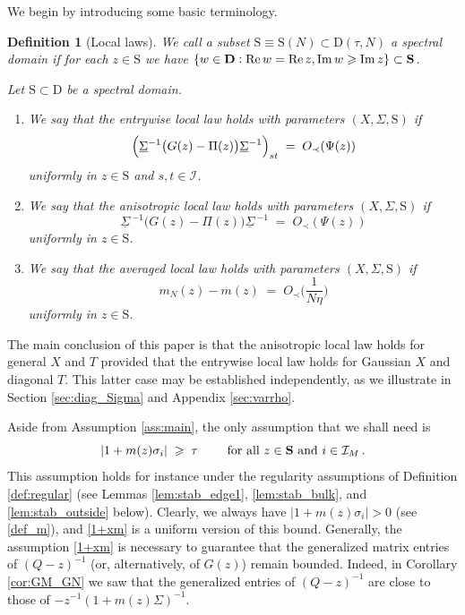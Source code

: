 \documentclass[11pt]{article} %
\numberwithin{equation}{section}
\numberwithin{figure}{section}
\theoremstyle{plain} %
\newtheorem{definition}[theorem]{Definition}
\theoremstyle{definition} %
\newcommand{\f}[1]{\boldsymbol{\mathrm{#1}}} %
\renewcommand{\cal}{\mathcal}
\newcommand{\ul}[1]{\underline{#1} \!\,} %
\newcommand{\txt}[1]{\text{\rm{#1}}}
\newcommand{\col}{\mathrel{\vcenter{\baselineskip0.75ex \lineskiplimit0pt \hbox{.}\hbox{.}}}}
\renewcommand{\geq}{\geqslant}
\newcommand{\pb}[1]{\bigl({#1}\bigr)}
\newcommand{\pB}[1]{\Bigl({#1}\Bigr)}
\newcommand{\pbb}[1]{\biggl({#1}\biggr)}
\newcommand{\h}[1]{\{{#1}\}}
\newcommand{\abs}[1]{\lvert #1 \rvert}
\DeclareMathOperator{\re}{Re}
\DeclareMathOperator{\im}{Im}
\begin{document}
We begin by introducing some basic terminology.
\begin{definition}[Local laws] \label{def:local_laws}
We call a subset $\f S \equiv \f S(N) \subset \f D(\tau, N)$ a \emph{spectral domain} if for each $z \in \f S$ we have $\h{w \in \f D \col \re w = \re z, \im w \geq \im z} \subset \f S$.

Let $\f S \subset \f D$ be a spectral domain.
\begin{enumerate}
\item
We say that the \emph{entrywise local law holds with parameters $(X, \Sigma, \f S)$} if
\begin{equation} \label{entrywise law}
\pB{\ul \Sigma^{-1} \pb{G(z) - \Pi(z)} \ul \Sigma^{-1}}_{st} \;=\; O_\prec(\Psi(z))
\end{equation}
uniformly in $z \in \f S$ and $s,t \in \cal I$.
\item
We say that the \emph{anisotropic local law holds with parameters $(X, \Sigma, \f S)$} if
\begin{equation} \label{isotropic law}
\ul \Sigma^{-1} \pb{G(z) - \Pi(z)} \ul \Sigma^{-1} \;=\; O_\prec(\Psi(z))
\end{equation}
uniformly in $z \in \f S$.
\item
We say that the \emph{averaged local law holds with parameters $(X, \Sigma, \f S)$} if
\begin{equation*}
m_N(z) - m(z) \;=\; O_\prec \pbb{\frac{1}{N \eta}}
\end{equation*}
uniformly in $z \in \f S$.
\end{enumerate}
\end{definition}

The main conclusion of this paper is that the anisotropic local law holds for general $X$ and $T$ provided that the entrywise local law holds for Gaussian $X$ and  diagonal $T$. This latter case may be established independently, as we illustrate in Section \ref{sec:diag_Sigma} and Appendix \ref{sec:varrho}.

Aside from Assumption \ref{ass:main}, the only assumption that we shall need is
\begin{equation} \label{1+xm}
\abs{1 + m(z) \sigma_i} \;\geq\; \tau \qquad \txt{ for all } z \in \f S \txt{ and } i \in \cal I_M\,.
\end{equation}
This assumption holds for instance under the regularity assumptions of Definition \ref{def:regular} (see Lemmas \ref{lem:stab_edge1}, \ref{lem:stab_bulk}, and \ref{lem:stab_outside} below). Clearly, we always have $\abs{1 + m(z) \sigma_i} > 0$ (see \eqref{def_m}), and \eqref{1+xm} is a uniform version of this bound. Generally, the assumption \eqref{1+xm} is necessary to guarantee that the generalized matrix entries of $(Q - z)^{-1}$ (or, alternatively, of $G(z)$) remain bounded. Indeed, in Corollary \ref{cor:GM_GN} we saw that the generalized entries of $(Q - z)^{-1}$ are close to those of $-z^{-1} (1 + m(z) \Sigma)^{-1}$.
\end{document}
